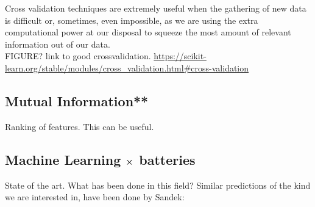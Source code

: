 	Cross validation techniques are extremely useful when the gathering of new data is difficult or, sometimes, even impossible, as we are using the extra computational power at our disposal to squeeze the most amount of relevant information out of our data.\\

FIGURE?
link to good crossvalidation.
\url{https://scikit-learn.org/stable/modules/cross_validation.html#cross-validation}

\subsection{Mutual Information**}
Ranking of features. 
This can be useful.

\subsection{Machine Learning $\cross$ batteries}
State of the art.
What has been done in this field? 
Similar predictions of the kind we are interested in, have been done by 
Sandek: \cite{sendek2017holistic}
